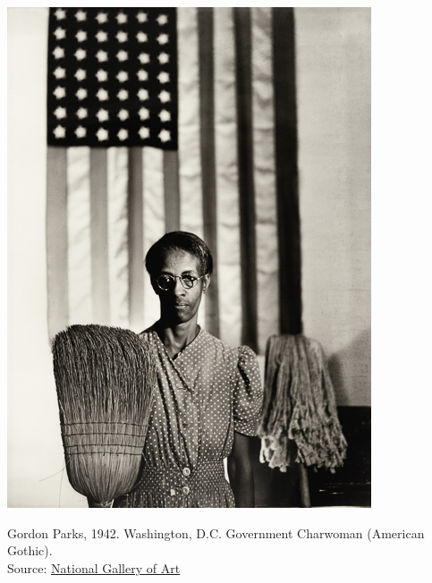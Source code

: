 \documentclass{beamer}
\begin{document}
\begin{frame}
\includegraphics[height = .85\textheight]{figures/Parks-Charwoman-WSS}\\
\begin{footnotesize}
Gordon Parks, 1942. Washington, D.C. Government Charwoman (American Gothic).\\
Source: \href{https://www.nga.gov/learn/teachers/lessons-activities/uncovering-america/great-depression.html}{National Gallery of Art}
\end{footnotesize}
\end{frame}
\end{document}
